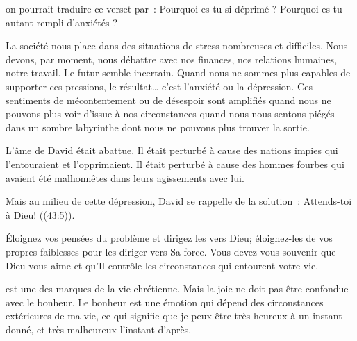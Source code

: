 


 on pourrait traduire ce verset par~:
 \og Pourquoi es-tu si déprimé ?
 Pourquoi es-tu autant rempli d'anxiétés ? \fg{}

La société nous place dans des situations de stress nombreuses et difficiles.
 Nous devons, par moment, nous débattre avec nos finances,
 nos relations humaines, notre travail.
 Le futur semble incertain. Quand nous ne sommes plus capables
 de supporter ces pressions, le résultat\dots{}
 c'est l'anxiété ou la dépression.
 Ces sentiments de mécontentement ou de désespoir sont amplifiés
 quand nous ne pouvons plus voir d'issue à nos circonstances
 \ocadr quand nous nous sentons piégés dans un sombre labyrinthe
 dont nous ne pouvons plus trouver la sortie. 

L'âme de David était abattue. Il était perturbé à cause des nations impies
 qui l'entouraient et l'opprimaient.
 Il était perturbé à cause des hommes fourbes qui avaient été malhonnêtes
 dans leurs agissements avec lui. 

Mais au milieu de cette dépression, David se rappelle de la solution~:
 \og Attends-toi à Dieu! \fg{} ((43:5)).



Éloignez vos pensées du problème et dirigez les vers Dieu;
 éloignez-les de vos propres faiblesses pour les diriger vers Sa force.
 Vous devez vous souvenir que Dieu vous aime et qu'Il contrôle
 les circonstances qui entourent votre vie. 

\dvrule






 est une des marques de la vie chrétienne.
 Mais la joie ne doit pas être confondue avec le bonheur.
 Le bonheur est une émotion qui dépend des circonstances
 extérieures de ma vie, ce qui signifie que je peux être très heureux
 à un instant donné, et très malheureux l'instant d'après. 

